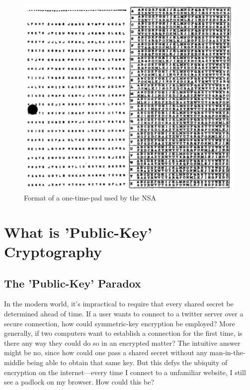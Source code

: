 \documentclass[11pt, a4paper]{report}
\begin{document}
\begin{figure}[h]
\begin{center}
\includegraphics[scale=.29]{diana} 
\caption{Format of a one-time-pad used by the NSA\autocite{diana}}
\end{center}
\end{figure}


\section{What is 'Public-Key' Cryptography}

\subsection{The 'Public-Key' Paradox}

In the modern world, it's impractical to require that every shared secret be determined ahead of time. If a user wants to connect to a twitter server over a secure connection, how could symmetric-key encryption be employed? 
More generally, if two computers want to establish a connection for the first time, is there any way they could do so in an encrypted matter? The intuitive answer might be no, since how could one pass a shared secret without any man-in-the-middle being able to obtain that same key. But this defys the ubiquity of encryption on the internet—every time I connect to a unfamiliar website, I still see a padlock on my browser. How could this be?
\end{document}
